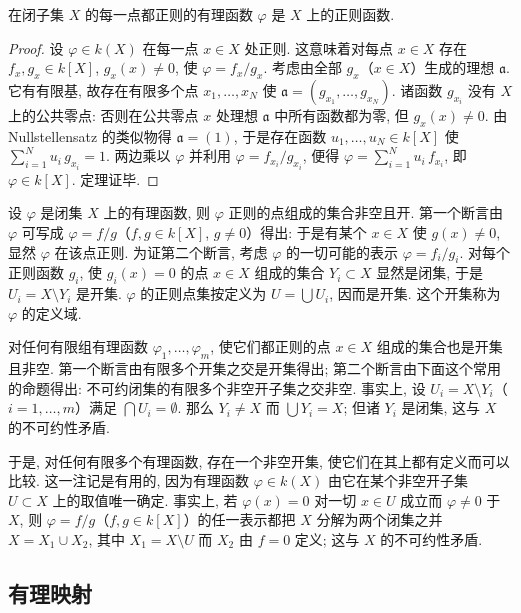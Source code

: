 \begin{theorem}\label{thm:regular-everywhere}
	在闭子集 $X$ 的每一点都正则的有理函数 $\varphi$ 是 $X$ 上的正则函数.
\end{theorem}

\begin{proof}
	设 $\varphi \in k(X)$ 在每一点 $x \in X$ 处正则. 这意味着对每点 $x \in X$ 存在 $f_x, g_x \in k[X]$, $g_x(x) \ne 0$, 使 $\varphi = f_x / g_x$. 考虑由全部 $g_x$（$x \in X$）生成的理想 $\mathfrak a$. 它有有限基, 故存在有限多个点 $x_1, \ldots, x_N$ 使 $\mathfrak a = (g_{x_1}, \ldots, g_{x_N})$. 诸函数 $g_{x_i}$ 没有 $X$ 上的公共零点: 否则在公共零点 $x$ 处理想 $\mathfrak a$ 中所有函数都为零, 但 $g_x(x) \ne 0$. 由 Nullstellensatz 的类似物得 $\mathfrak a = (1)$, 于是存在函数 $u_1, \ldots, u_N \in k[X]$ 使 $\sum_{i=1}^N u_i\, g_{x_i} = 1$. 两边乘以 $\varphi$ 并利用 $\varphi = f_{x_i}/g_{x_i}$, 便得 $\varphi = \sum_{i=1}^N u_i\, f_{x_i}$, 即 $\varphi \in k[X]$. 定理证毕.
\end{proof}

设 $\varphi$ 是闭集 $X$ 上的有理函数, 则 $\varphi$ 正则的点组成的集合非空且开. 第一个断言由 $\varphi$ 可写成 $\varphi = f/g$（$f, g \in k[X]$, $g \ne 0$）得出: 于是有某个 $x \in X$ 使 $g(x) \ne 0$, 显然 $\varphi$ 在该点正则. 为证第二个断言, 考虑 $\varphi$ 的一切可能的表示 $\varphi = f_i/g_i$. 对每个正则函数 $g_i$, 使 $g_i(x) = 0$ 的点 $x \in X$ 组成的集合 $Y_i \subset X$ 显然是闭集, 于是 $U_i = X \setminus Y_i$ 是开集. $\varphi$ 的正则点集按定义为 $U = \bigcup U_i$, 因而是开集. 这个开集称为 $\varphi$ 的定义域.

对任何有限组有理函数 $\varphi_1, \ldots, \varphi_m$, 使它们都正则的点 $x \in X$ 组成的集合也是开集且非空. 第一个断言由有限多个开集之交是开集得出; 第二个断言由下面这个常用的命题得出: 不可约闭集的有限多个非空开子集之交非空. 事实上, 设 $U_i = X \setminus Y_i$（$i = 1, \ldots, m$）满足 $\bigcap U_i = \emptyset$. 那么 $Y_i \ne X$ 而 $\bigcup Y_i = X$; 但诸 $Y_i$ 是闭集, 这与 $X$ 的不可约性矛盾.

于是, 对任何有限多个有理函数, 存在一个非空开集, 使它们在其上都有定义而可以比较. 这一注记是有用的, 因为有理函数 $\varphi \in k(X)$ 由它在某个非空开子集 $U \subset X$ 上的取值唯一确定. 事实上, 若 $\varphi(x) = 0$ 对一切 $x \in U$ 成立而 $\varphi \ne 0$ 于 $X$, 则 $\varphi = f/g$（$f, g \in k[X]$）的任一表示都把 $X$ 分解为两个闭集之并 $X = X_1 \cup X_2$, 其中 $X_1 = X \setminus U$ 而 $X_2$ 由 $f = 0$ 定义; 这与 $X$ 的不可约性矛盾.

\subsection{有理映射}

